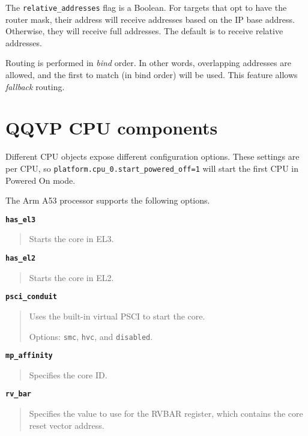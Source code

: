 The {\small{\lstinline!relative_addresses!}} flag is a Boolean. For targets that opt to have the router mask, their address will receive addresses based on the IP base address. Otherwise, they will receive full addresses. The default is to receive relative addresses.

\note Routing is performed in \emph{bind} order. In other words, overlapping addresses are allowed, and the first to match (in bind order) will be used. This feature allows \emph{fallback} routing.


\clearpage
\section{QQVP CPU components}

Different CPU objects expose different configuration options. These settings are per CPU, so {\small{\lstinline!platform.cpu_0.start_powered_off=1!}} will start the first CPU in Powered On mode.

The Arm A53 processor supports the following options.

{\textbf {\footnotesize{\lstinline!has_el3!}}}
\vspace{-2pt}
\begin{quote}
Starts the core in EL3.
\end{quote}


{\textbf {\footnotesize{\lstinline!has_el2!}}}
\vspace{-2pt}
\begin{quote}
Starts the core in EL2.
\end{quote}


{\textbf {\footnotesize{\lstinline!psci_conduit!}}}
\vspace{-2pt}
\begin{quote}
Uses the built-in virtual PSCI to start the core.

Options: {\small{\lstinline!smc!}}, {\small{\lstinline!hvc!}}, and {\small{\lstinline!disabled!}}.
\end{quote}


{\textbf {\footnotesize{\lstinline!mp_affinity!}}}
\vspace{-2pt}
\begin{quote}
Specifies the core ID.
\end{quote}


{\textbf {\footnotesize{\lstinline!rv_bar!}}}
\vspace{-2pt}
\begin{quote}
Specifies the value to use for the RVBAR register, which contains the core reset vector address.
\end{quote}


